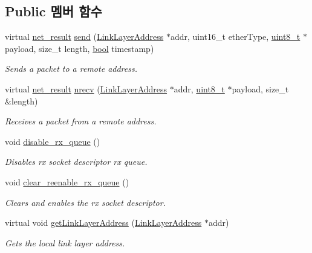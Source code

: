 \subsection*{Public 멤버 함수}
\begin{DoxyCompactItemize}
\item 
virtual \hyperlink{avbts__osnet_8hpp_a21b2b4b5e479ef3adfc039ac30c961cd}{net\+\_\+result} \hyperlink{class_linux_network_interface_a16eac0643a26a66fa2b664d4db5d3e42}{send} (\hyperlink{class_link_layer_address}{Link\+Layer\+Address} $\ast$addr, uint16\+\_\+t ether\+Type, \hyperlink{stdint_8h_aba7bc1797add20fe3efdf37ced1182c5}{uint8\+\_\+t} $\ast$payload, size\+\_\+t length, \hyperlink{avb__gptp_8h_af6a258d8f3ee5206d682d799316314b1}{bool} timestamp)
\begin{DoxyCompactList}\small\item\em Sends a packet to a remote address. \end{DoxyCompactList}\item 
virtual \hyperlink{avbts__osnet_8hpp_a21b2b4b5e479ef3adfc039ac30c961cd}{net\+\_\+result} \hyperlink{class_linux_network_interface_acb980fe584d47a71be88f12808edd91c}{nrecv} (\hyperlink{class_link_layer_address}{Link\+Layer\+Address} $\ast$addr, \hyperlink{stdint_8h_aba7bc1797add20fe3efdf37ced1182c5}{uint8\+\_\+t} $\ast$payload, size\+\_\+t \&length)
\begin{DoxyCompactList}\small\item\em Receives a packet from a remote address. \end{DoxyCompactList}\item 
void \hyperlink{class_linux_network_interface_aea47eda14c7a467ec4c4796ff1edf7cb}{disable\+\_\+rx\+\_\+queue} ()
\begin{DoxyCompactList}\small\item\em Disables rx socket descriptor rx queue. \end{DoxyCompactList}\item 
void \hyperlink{class_linux_network_interface_ab9f0254cefe0a8d35dcd300a3de79bac}{clear\+\_\+reenable\+\_\+rx\+\_\+queue} ()
\begin{DoxyCompactList}\small\item\em Clears and enables the rx socket descriptor. \end{DoxyCompactList}\item 
virtual void \hyperlink{class_linux_network_interface_acf4cbb5b708d3feb8e970da49d853fae}{get\+Link\+Layer\+Address} (\hyperlink{class_link_layer_address}{Link\+Layer\+Address} $\ast$addr)
\begin{DoxyCompactList}\small\item\em Gets the local link layer address. \end{DoxyCompactList}\item 

\end{DoxyCompactItemize}
